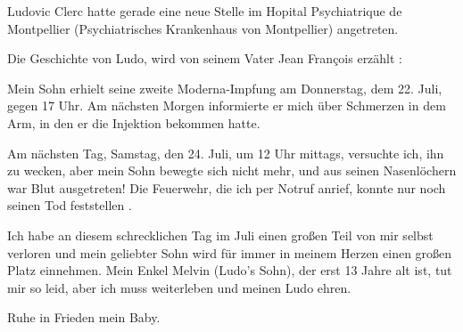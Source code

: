 Ludovic Clerc hatte gerade eine neue Stelle im Hopital Psychiatrique de
Montpellier (Psychiatrisches Krankenhaus von Montpellier) angetreten.

Die Geschichte von Ludo, wird von seinem Vater Jean François erzählt :

Mein Sohn erhielt seine zweite Moderna-Impfung am Donnerstag, dem 22. Juli,
gegen 17 Uhr. Am nächsten Morgen informierte er mich über Schmerzen in dem Arm,
in den er die Injektion bekommen hatte.

Am nächsten Tag, Samstag, den 24. Juli, um 12 Uhr mittags, versuchte ich, ihn zu
wecken, aber mein Sohn bewegte sich nicht mehr, und aus seinen Nasenlöchern war
Blut ausgetreten! Die Feuerwehr, die ich per Notruf anrief, konnte nur noch
seinen Tod feststellen .

Ich habe an diesem schrecklichen Tag im Juli einen großen Teil von mir selbst
verloren und mein geliebter Sohn wird für immer in meinem Herzen einen großen
Platz einnehmen. Mein Enkel Melvin (Ludo's Sohn), der erst 13 Jahre alt ist, tut
mir so leid, aber ich muss weiterleben und meinen Ludo ehren.

Ruhe in Frieden mein Baby.
